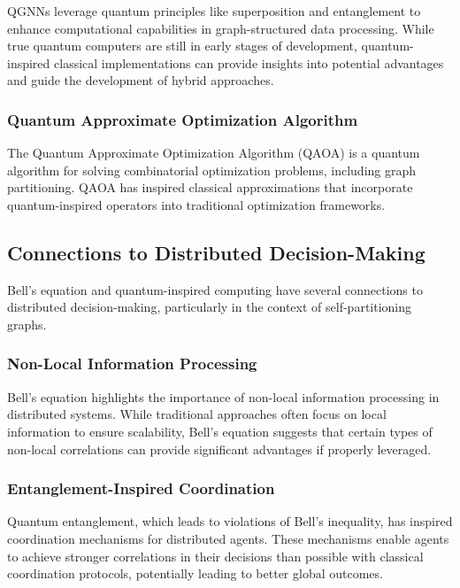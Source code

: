 \documentclass{article}
\begin{document}
QGNNs leverage quantum principles like superposition and entanglement to enhance computational capabilities in graph-structured data processing. While true quantum computers are still in early stages of development, quantum-inspired classical implementations can provide insights into potential advantages and guide the development of hybrid approaches.

\subsubsection{Quantum Approximate Optimization Algorithm}

The Quantum Approximate Optimization Algorithm (QAOA) \cite{farhi2014quantum} is a quantum algorithm for solving combinatorial optimization problems, including graph partitioning. QAOA has inspired classical approximations that incorporate quantum-inspired operators into traditional optimization frameworks.

\subsection{Connections to Distributed Decision-Making}

Bell's equation and quantum-inspired computing have several connections to distributed decision-making, particularly in the context of self-partitioning graphs.

\subsubsection{Non-Local Information Processing}

Bell's equation highlights the importance of non-local information processing in distributed systems. While traditional approaches often focus on local information to ensure scalability, Bell's equation suggests that certain types of non-local correlations can provide significant advantages if properly leveraged.

\subsubsection{Entanglement-Inspired Coordination}

Quantum entanglement, which leads to violations of Bell's inequality, has inspired coordination mechanisms for distributed agents. These mechanisms enable agents to achieve stronger correlations in their decisions than possible with classical coordination protocols, potentially leading to better global outcomes.
\end{document}
